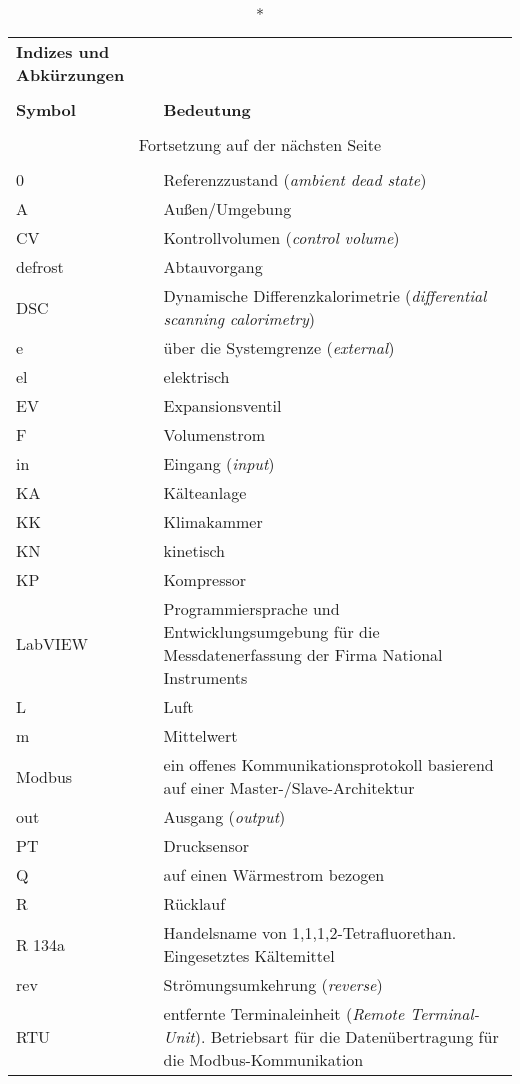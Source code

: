 \begin{onehalfspacing}
\begin{longtable}[h]{p{} p{}}
		\caption*{\textbf{Indizes und Abkürzungen}} \\
		\\
		\textbf{Symbol} & \textbf{Bedeutung} \\ %
		\endhead
		\\
		\multicolumn{2}{c}{Fortsetzung auf der nächsten Seite} \\
		\endfoot
		\multicolumn{2}{c}{ } \\
		\endlastfoot
		
		0 & Referenzzustand (\emph{ambient dead state})\\
		A & Außen/Umgebung\\ 		
		CV & Kontrollvolumen (\emph{control volume})\\
		defrost & Abtauvorgang\\
		DSC & Dynamische Differenzkalorimetrie (\emph{differential scanning calorimetry}) \\
		e & über die Systemgrenze (\emph{external})\\
		el & elektrisch \\
		EV & Expansionsventil\\
		F & Volumenstrom\\	
		in & Eingang (\emph{input})\\
		KA & Kälteanlage \\
		KK & Klimakammer\\
		KN & kinetisch\\
		KP & Kompressor\\
		LabVIEW & Programmiersprache und Entwicklungsumgebung für die Messdatenerfassung der Firma National Instruments\\
		L & Luft\\
		m & Mittelwert\\
		Modbus & ein offenes Kommunikationsprotokoll basierend auf einer Master-/Slave-Architektur \\
		out & Ausgang (\emph{output})\\
		PT & Drucksensor\\
		Q & auf einen Wärmestrom bezogen\\
		R & Rücklauf\\
		R 134a & Handelsname von 1,1,1,2-Tetrafluorethan. Eingesetztes Kältemittel\\ 
		rev & Strömungsumkehrung (\emph{reverse})\\
		RTU & entfernte Terminaleinheit (\emph{Remote Terminal-Unit}). Betriebsart für die Datenübertragung für die Modbus-Kommunikation \\

\end{longtable}
\end{onehalfspacing}

